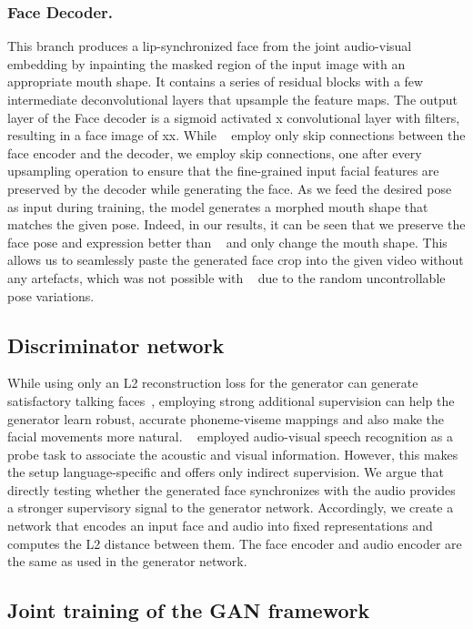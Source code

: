 \documentclass[sigconf]{acmart}
\begin{document}
\subsubsection{Face Decoder.} This branch produces a lip-synchronized face from the joint audio-visual embedding by inpainting the masked region of the input image with an appropriate mouth shape. It contains a series of residual blocks with a few intermediate deconvolutional layers that upsample the feature maps. The output layer of the Face decoder is a sigmoid activated x convolutional layer with  filters, resulting in a face image of xx. While ~\citet{chung2017you} employ only  skip connections between the face encoder and the decoder, we employ  skip connections, one after every upsampling operation to ensure that the fine-grained input facial features are preserved by the decoder while generating the face. As we feed the desired pose as input during training, the model generates a morphed mouth shape that matches the given pose. Indeed, in our results, it can be seen that we preserve the face pose and expression better than ~\citet{chung2017you} and only change the mouth shape. This allows us to seamlessly paste the generated face crop into the given video without any artefacts, which was not possible with ~\citet{chung2017you} due to the random uncontrollable pose variations.

\subsection{Discriminator network} While using only an L2 reconstruction loss for the generator can generate satisfactory talking faces~\cite{chung2017you}, employing strong additional supervision can help the generator learn robust, accurate phoneme-viseme mappings and also make the facial movements more natural. ~\citet{zhou2018talking} employed audio-visual speech recognition as a probe task to associate the acoustic and visual information. However, this makes the setup language-specific and offers only indirect supervision. We argue that directly testing whether the generated face synchronizes with the audio provides a stronger supervisory signal to the generator network. Accordingly, we create a network that encodes an input face and audio into fixed representations and computes the L2 distance  between them. The face encoder and audio encoder are the same as used in the generator network.

\subsection{Joint training of the GAN framework} 
\end{document}
